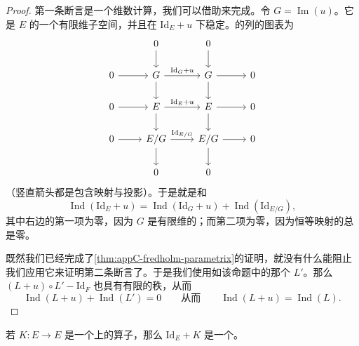 \begin{proof}
第一条断言是一个维数计算，我们可以借助\trEulerCharacteristic{}来完成。令 $G = \operatorname{Im}(u)$。它是 $E$ 的一个有限维子空间，并且在 $\mathrm{Id}_E + u$ 下稳定。\trChainComplex{}的\trExact{}列的图表为
\[
\begin{tikzcd}
 & 0 \arrow[d] & 0 \arrow[d] \\
0 \arrow[r] & G \arrow[r, "\mathrm{Id}_G + u"] \arrow[d] & G \arrow[r] \arrow[d] & 0 \\
0 \arrow[r] & E \arrow[r, "\mathrm{Id}_E + u"] \arrow[d] & E \arrow[r] \arrow[d] & 0 \\
0 \arrow[r] & E/G \arrow[r, "\mathrm{Id}_{E/G}"] \arrow[d] & E/G \arrow[r] \arrow[d] & 0 \\
 & 0 & 0
\end{tikzcd}
\]
（竖直箭头都是包含映射与投影）。于是\trIndex{}就是和
\[
\operatorname{Ind}(\mathrm{Id}_E + u) = \operatorname{Ind}(\mathrm{Id}_G + u) + \operatorname{Ind}(\mathrm{Id}_{E/G}),
\]
其中右边的第一项为零，因为 $G$ 是有限维的；而第二项为零，因为恒等映射的\trIndex{}总是零。

既然我们已经完成了\cref{thm:appC-fredholm-parametrix}的证明，就没有什么能阻止我们应用它来证明第二条断言了。于是我们使用如该命题中的那个 $L'$。那么 $(L + u) \circ L' - \mathrm{Id}_F$ 也具有有限的秩，从而
\[
\operatorname{Ind}(L + u) + \operatorname{Ind}(L') = 0 \qquad\text{从而}\qquad \operatorname{Ind}(L + u) = \operatorname{Ind}(L).
\]
\end{proof}

\begin{proposition}\label{thm:appC-compact-perturbation}
若 $K : E \to E$ 是一个\trBanachSpace{}上的\trCompact{}算子，那么 $\mathrm{Id}_E + K$ 是一个\trFredholmOperator。
\end{proposition}

